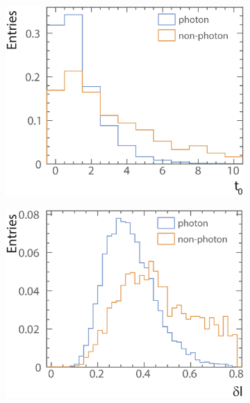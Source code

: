 \begin{figure}[tbph]
\centering
  \begin{subfigure}[b]{0.45\textwidth}
    \includegraphics[width=\textwidth]{photon/likelihood/LongProfileStart2}
    \caption{}
    \label{fig:photonLongProfileStart}
  \end{subfigure}
  \begin{subfigure}[b]{0.45\textwidth}
    \includegraphics[width=\textwidth]{photon/likelihood/LongProfileDiscrepancy2}
    \caption{}
    \label{fig:photonLongProfileDiscrepancy}
  \end{subfigure}
  \begin{subfigure}[b]{0.45\textwidth}

\end{subfigure}
\end{figure}

